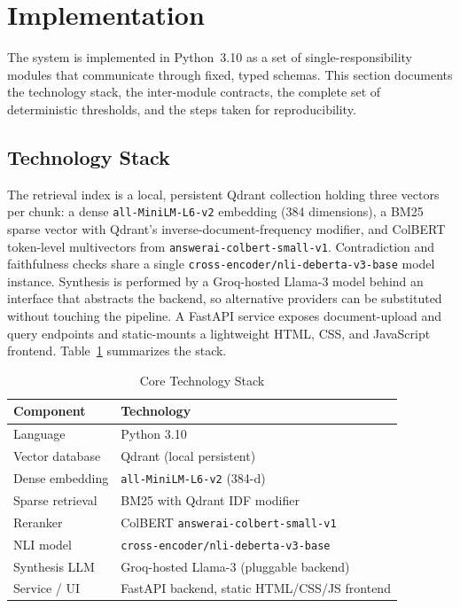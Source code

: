 \documentclass[conference]{IEEEtran}
\begin{document}
\section{Implementation}
\label{sec:impl}

The system is implemented in Python~3.10 as a set of single-responsibility
modules that communicate through fixed, typed schemas. This section
documents the technology stack, the inter-module contracts, the complete
set of deterministic thresholds, and the steps taken for reproducibility.

\subsection{Technology Stack}
The retrieval index is a local, persistent Qdrant collection holding three
vectors per chunk: a dense \texttt{all-MiniLM-L6-v2} embedding (384
dimensions), a BM25 sparse vector with Qdrant's inverse-document-frequency
modifier, and ColBERT token-level multivectors from
\texttt{answerai-colbert-small-v1}. Contradiction and faithfulness checks
share a single \texttt{cross-encoder/nli-deberta-v3-base} model instance.
Synthesis is performed by a Groq-hosted Llama-3 model behind an interface
that abstracts the backend, so alternative providers can be substituted
without touching the pipeline. A FastAPI service exposes document-upload
and query endpoints and static-mounts a lightweight HTML, CSS, and
JavaScript frontend. Table~\ref{tab:stack} summarizes the stack.

\begin{table}[htbp]
\caption{Core Technology Stack}
\label{tab:stack}
\centering
\small
\begin{tabularx}{\columnwidth}{@{}l X@{}}
\toprule
Component & Technology \\
\midrule
Language          & Python 3.10 \\
Vector database   & Qdrant (local persistent) \\
Dense embedding   & \texttt{all-MiniLM-L6-v2} (384-d) \\
Sparse retrieval  & BM25 with Qdrant IDF modifier \\
Reranker          & ColBERT \texttt{answerai-colbert-small-v1} \\
NLI model         & \texttt{cross-encoder/nli-deberta-v3-base} \\
Synthesis LLM     & Groq-hosted Llama-3 (pluggable backend) \\
Service / UI      & FastAPI backend, static HTML/CSS/JS frontend \\
\bottomrule
\end{tabularx}
\end{table}
\end{document}
